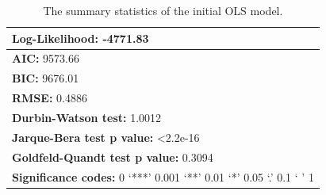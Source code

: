 \begin{table}[]
\begin{tabular}{|llllll|}
\multicolumn{6}{|l|}{\textbf{Log-Likelihood:} -4771.83}                                                                                                                                          \\ \hline
\multicolumn{6}{|l|}{\textbf{AIC:} 9573.66}                                                                                                                                                      \\ \hline
\multicolumn{6}{|l|}{\textbf{BIC:} 9676.01}                                                                                                                                                      \\ \hline
\multicolumn{6}{|l|}{\textbf{RMSE:} 0.4886}                                                                                                                                                      \\ \hline \hline
\multicolumn{6}{|l|}{\textbf{Durbin-Watson test:} 1.0012}                                                                                                                                        \\ \hline
\multicolumn{6}{|l|}{\textbf{Jarque-Bera test p value:} \textless 2.2e-16}                                                                                                                       \\ \hline
\multicolumn{6}{|l|}{\textbf{Goldfeld-Quandt test p value:} 0.3094}                                                                                                                              \\ \hline \hline
\multicolumn{6}{|l|}{\textbf{Significance codes:} 0 ‘***’ 0.001 ‘**’ 0.01 ‘*’ 0.05 ‘.’ 0.1 ‘ ’ 1}                                                                                                \\ \hline
\end{tabular}
\caption{
The summary statistics of the initial OLS model.
}
\label{tab: A4.1}
\end{table}


